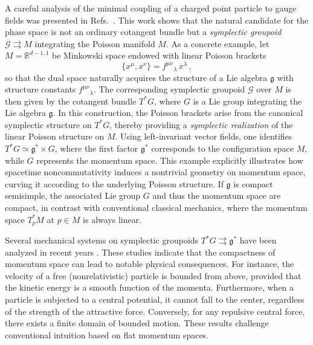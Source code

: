 \documentclass[12pt,a4paper]{article}
\numberwithin{equation}{section}
\theoremstyle{theorem}
\theoremstyle{remark}
\begin{document}
A careful analysis of the minimal coupling of a charged point particle to gauge fields was presented in Refs.~\cite{kupriyanov2024symplectic,sharapov2024poisson}. This work shows that the natural candidate for the phase space is not an ordinary cotangent bundle but a {\it symplectic groupoid}
$
\mathcal{G} \rightrightarrows M
$
integrating the Poisson manifold $M$. As a concrete example, let $M=\mathbb{R}^{d-1,1}$ be Minkowski space endowed with linear Poisson brackets 
\begin{equation}\label{LPB}
\{x^\mu, x^\nu\} = f^{\mu\nu}{}_\lambda \, x^\lambda\,,
\end{equation}
so that the dual space naturally acquires the structure of a Lie algebra $\mathfrak{g}$ with structure constants $f^{\mu\nu}{}_\lambda$. The corresponding symplectic groupoid $\mathcal{G}$ over $M$ is then given by the cotangent bundle 
$
T^\ast G
$,
where $G$ is a Lie group integrating the Lie algebra $\mathfrak{g}$. In this construction, the Poisson brackets arise from the canonical symplectic structure on $T^\ast G$, thereby providing a {\it symplectic realization} of the linear Poisson structure on $M$. Using left-invariant vector fields, one identifies $T^\ast G \simeq \mathfrak{g}^\ast \times G$, where the first factor $\mathfrak{g}^\ast$ corresponds to the configuration space $M$, while $G$ represents the momentum space. 
This example explicitly illustrates how spacetime noncommutativity induces a nontrivial geometry on momentum space, curving it according to the underlying Poisson structure. If $\mathfrak{g}$ is compact semisimple, the associated Lie group $G$ and thus the momentum space are compact, in contrast with conventional classical mechanics, where the momentum space $T^\ast_p M$ at $p\in M$ is always linear.

Several mechanical systems on symplectic groupoids $T^\ast G \rightrightarrows \mathfrak{g}^\ast$ have been analyzed in recent years \cite{FSK,MFK,kupriyanov2024classical, basilio2025charged}. These studies indicate that the compactness of momentum space can lead to notable physical consequences. For instance, the velocity of a free (nonrelativistic) particle is bounded from above, provided that the kinetic energy is a smooth function of the momenta. Furthermore, when a particle is subjected to a central potential, it cannot fall to the center, regardless of the strength of the attractive force. Conversely, for any repulsive central force, there exists a finite domain of bounded motion. These results challenge conventional intuition based on flat momentum spaces. 
\end{document}
